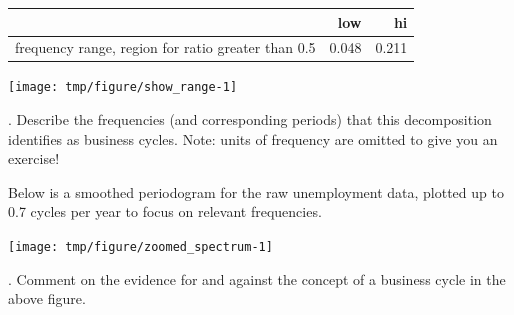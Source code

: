 \begin{frame}[fragile]





\begin{knitrout}\small
{}\color{fgcolor}
\begin{tabular}{l|r|r}
\hline
  & low & hi\\
\hline
frequency range, region for ratio greater than 0.5 & 0.048 & 0.211\\
\hline
\end{tabular}

\end{knitrout}

\begin{knitrout}\small
{}\color{fgcolor}

{\centering \texttt{[image: tmp/figure/show\_range-1]} 

}


\end{knitrout}

\myquestion. Describe the frequencies (and corresponding periods) that this decomposition identifies as business cycles. Note: units of frequency are omitted to give you an exercise!


\end{frame}

\begin{frame}[fragile]


Below is a smoothed periodogram for the raw unemployment data, plotted up to 0.7 cycles per year to focus on relevant frequencies.

\begin{knitrout}\small
{}\color{fgcolor}

{\centering \texttt{[image: tmp/figure/zoomed\_spectrum-1]} 

}


\end{knitrout}

\vspace{-1mm}

\myquestion. Comment on the evidence for and against the concept of a business cycle in the above figure.


\end{frame}

